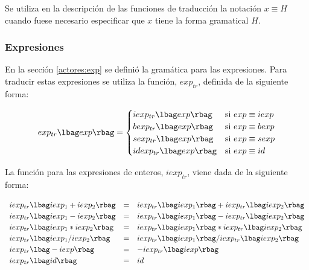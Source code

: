 Se utiliza en la descripción de las funciones de traducción la notación $x \equiv H$ cuando fuese necesario especificar que $x$ tiene la forma gramatical $H$.

\subsubsection*{Expresiones}
En la sección \ref{actores:exp} se definió la gramática para las expresiones. Para traducir estas expresiones se utiliza la función, $exp_{tr}$, definida de la siguiente forma:
\newcommand{\func}[1]{\lbag #1 \rbag}


\begin{equation*}
  exp_{tr} \func{exp} =
  \setlength{\arraycolsep}{0pt}
  \renewcommand{\arraystretch}{1.2}
  \left\{\begin{array}{l @{\quad} l}
        iexp_{tr}\func{exp}     & \text{si $exp \equiv iexp$} \\
        bexp_{tr}\func{exp}     & \text{si $exp \equiv bexp$} \\
        sexp_{tr}\func{exp}     & \text{si $exp \equiv sexp$} \\
        idexp_{tr}\func{exp}    & \text{si $exp \equiv id$} \\
  \end{array}\right.
\end{equation*}

La función para las expresiones de enteros, $iexp_{tr}$, viene dada de la siguiente forma:

\begin{equation*}
\begin{array}{l c l}
iexp_{tr}\func{iexp_1 + iexp_2} &=& iexp_{tr}\func{iexp_1} + iexp_{tr}\func{iexp_2} \\
iexp_{tr}\func{iexp_1 - iexp_2} &=& iexp_{tr}\func{iexp_1} - iexp_{tr}\func{iexp_2} \\
iexp_{tr}\func{iexp_1 * iexp_2} &=& iexp_{tr}\func{iexp_1} * iexp_{tr}\func{iexp_2} \\ 
iexp_{tr}\func{iexp_1 / iexp_2} &=& iexp_{tr}\func{iexp_1} / iexp_{tr}\func{iexp_2} \\
iexp_{tr}\lbag - iexp \rbag &=& - iexp_{tr}\lbag iexp \rbag \\
iexp_{tr}\lbag id \rbag &=& id
\end{array}
\end{equation*}

